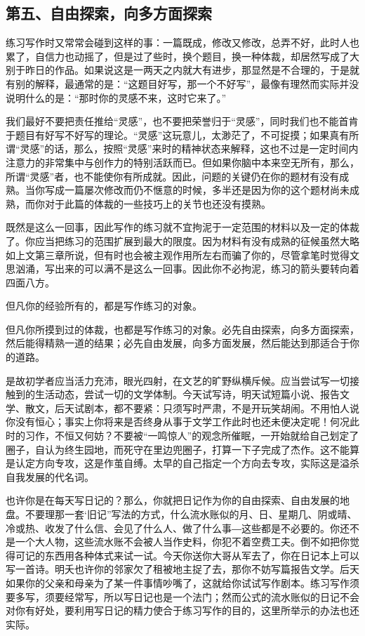 \documentclass[fontset=fandol,12pt,a5paper]{ctexbook}
\begin{document}
\subsection{第五、自由探索，向多方面探索}
练习写作时又常常会碰到这样的事：一篇既成，修改又修改，总弄不好，此时人也累了，自信力也动摇了，但是过了些时，换个题目，换一种体裁，却居然写成了大别于昨日的作品。如果说这是一两天之内就大有进步，那显然是不合理的，于是就有别的解释，最通常的是：“这题目好写，那一个不好写”，最像有理然而实际并没说明什么的是：“那时你的灵感不来，这时它来了。”

我们最好不要把责任推给“灵感”，也不要把荣誉归于“灵感”，同时我们也不能首肯于题目有好写不好写的理论。“灵感”这玩意儿，太渺茫了，不可捉摸；如果真有所谓“灵感”的话，那么，按照“灵感”来时的精神状态来解释，这也不过是一定时间内注意力的非常集中与创作力的特别活跃而已。但如果你脑中本来空无所有，那么，所谓“灵感”者，也不能使你有所成就。因此，问题的关键仍在你的题材有没有成熟。当你写成一篇屡次修改而仍不惬意的时候，多半还是因为你的这个题材尚未成熟，而你对于此篇的体裁的一些技巧上的关节也还没有摸熟。

既然是这么一回事，因此写作的练习就不宜拘泥于一定范围的材料以及一定的体裁了。你应当把练习的范围扩展到最大的限度。因为材料有没有成熟的征候虽然大略如上文第三章所说，但有时也会被主观作用所左右而骗了你的，尽管拿笔时觉得文思汹涌，写出来的可以满不是这么一回事。因此你不必拘泥，练习的箭头要转向着四面八方。

但凡你的经验所有的，都是写作练习的对象。

但凡你所摸到过的体裁，也都是写作练习的对象。必先自由探索，向多方面探索，然后能得精熟一道的结果；必先自由发展，向多方面发展，然后能达到那适合于你的道路。

是故初学者应当活力充沛，眼光四射，在文艺的旷野纵横斥候。应当尝试写一切接触到的生活动态，尝试一切的文学体制。今天试写诗，明天试短篇小说、报告文学、散文，后天试剧本，都不要紧：只须写时严肃，不是开玩笑胡闹。不用怕人说你没有恒心；事实上你将来是否终身从事于文学工作此时也还未便决定呢！何况此时的习作，不恒又何妨？不要被“一鸣惊人”的观念所催眠，一开始就给自己划定了圈子，自认为终生园地，而死守在里边兜圈子，打算一下子完成了杰作。这不能算是认定方向专攻，这是作茧自缚。太早的自己指定一个方向去专攻，实际这是溢杀自我发展的代名词。

也许你是在每天写日记的？那么，你就把日记作为你的自由探索、自由发展的地盘。不要理那一套‘旧记”写法的方式，什么流水账似的月、日、星期几、阴或晴、冷或热、收发了什么信、会见了什么人、做了什么事―这些都是不必要的。你还不是一个大人物，这些流水账不会被人当作史料，你犯不着空费工夫。倒不如把你觉得可记的东西用各种体式来试一试。今天你送你大哥从军去了，你在日记本上可以写一首诗。明夭也许你的邻家欠了租被地主捉了去，那你不妨写篇报告文学。后天如果你的父亲和母亲为了某一件事情吵嘴了，这就给你试试写作剧本。练习写作须要多写，须要经常写，所以写日记也是一个法门；然而公式的流水账似的日记不会对你有好处，要利用写日记的精力使合于练习写作的目的，这里所举示的办法也还实际。
\end{document}
